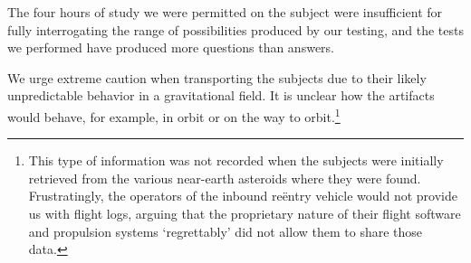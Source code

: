 \documentclass[10pt]{article}
\theoremstyle{definition}
\begin{document}
 
The four hours of study we were permitted on the subject were insufficient for fully interrogating the range of possibilities produced by our testing, and the tests we performed have produced more questions than answers.

We urge extreme caution when transporting the subjects due to their likely unpredictable behavior in a gravitational field.
It is unclear how the artifacts would behave, for example, in orbit or on the way to orbit.\footnote{This type of information was not recorded when the subjects were initially retrieved from the various near-earth asteroids where they were found. Frustratingly, the operators of the inbound re\"entry vehicle would not provide us with flight logs, arguing that the proprietary nature of their flight software and propulsion systems `regrettably' did not allow them to share those data.}

%
%
\end{document}
